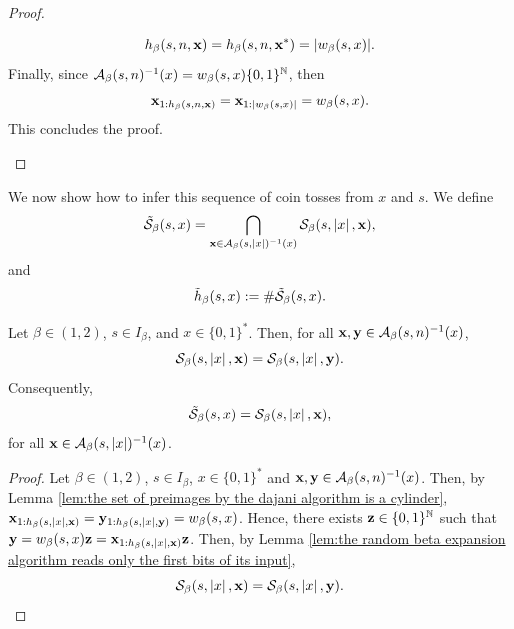\begin{proof}
\begin{enumerate}[label = (\alph*)]
        \begin{equation}
            h_\beta(s,n,{\bf x}) = h_\beta(s,n,{\bf x}^\ast) = |w_\beta(s,x)|.
        \end{equation}
        Finally, since $\mathcal{A}_\beta(s,n)^{-1}(x) = w_\beta(s,x) \{0,1\}^{\mathbb{N}}$, then 
        \begin{equation}
            {\bf x}_{1:h_\beta(s,n,{\bf x})} = {\bf x}_{1:|w_\beta(s,x)|} = w_\beta(s,x).
        \end{equation}
        This concludes the proof.
    \end{enumerate}
\end{proof}

\noindent We now show how to infer this sequence of coin tosses from $x$ and $s$. We define
\begin{equation}
    \tilde {\mathcal{S}}_\beta(s,x) = \bigcap_{{\bf x} \in \mathcal{A}_\beta(s,\left| x \right|)^{-1}(x)} \mathcal{S}_\beta(s,\left| x \right|,{\bf x}),
\end{equation}
and 
\begin{equation}
    \tilde h_\beta(s,x) := \# \tilde {\mathcal{S}}_\beta(s,x).
\end{equation}
\begin{lemma}\label{lem:every preimage of a beta expansion throught the dajani algorithm yields the occurences in the switch set}
    Let $\beta \in (1,2)$, $s \in I_\beta$, and $x \in \{0,1\}^\ast$. Then, for all ${\bf x},{\bf y} \in \mathcal{A}_\beta(s,n)^{-1}(x)$,
    \begin{equation}
        \mathcal{S}_\beta(s,\left| x \right|,{\bf x}) = \mathcal{S}_\beta(s,\left| x \right|,{\bf y}).
    \end{equation}
    Consequently,
    \begin{equation}
        \tilde {\mathcal{S}}_\beta(s,x) = \mathcal{S}_\beta(s,\left| x \right|,{\bf x}),
    \end{equation}
    for all ${\bf x} \in  \mathcal{A}_\beta(s,\left| x \right|)^{-1}(x)$.
\end{lemma}
\begin{proof}
    Let $\beta \in (1,2)$, $s \in I_\beta$, $x \in \{0,1\}^\ast$ and ${\bf x},{\bf y} \in \mathcal{A}_\beta(s,n)^{-1}(x)$. Then, by Lemma \ref{lem:the set of preimages by the dajani algorithm is a cylinder}, ${\bf x}_{1:h_\beta(s,|x|,{\bf x})} = {\bf y}_{1:h_\beta(s,|x|,{\bf y})} = w_\beta(s,x)$. Hence, there exists ${\bf z} \in \{0,1\}^{\mathbb{N}}$ such that ${\bf y} = w_\beta(s,x) {\bf z} = {\bf x}_{1:h_\beta(s,|x|,{\bf x})} {\bf z}$. Then, by Lemma \ref{lem:the random beta expansion algorithm reads only the first bits of its input},
    \begin{equation}
        \mathcal{S}_\beta(s,\left| x \right|,{\bf x}) = \mathcal{S}_\beta(s,\left| x \right|,{\bf y}).
    \end{equation}
\end{proof}
